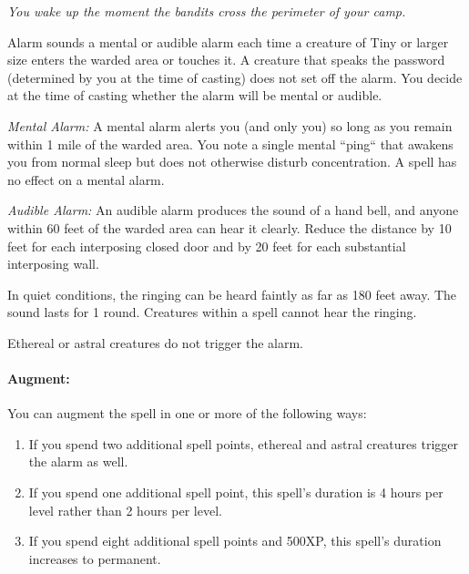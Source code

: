 \emph{You wake up the moment the bandits cross the perimeter of your camp.}

Alarm sounds a mental or audible alarm each time a creature of Tiny or larger size enters the warded area or touches it. 
A creature that speaks the password (determined by you at the time of casting) does not set off the alarm. 
You decide at the time of casting whether the alarm will be mental or audible.

\begin{list}{}{\leftmargin=1em}
 \item \emph{Mental Alarm:} A mental alarm alerts you (and only you) so long as you remain within 1 mile of the warded area. 
You note a single mental ``ping`` that awakens you from normal sleep but does not otherwise disturb concentration. 
A  spell has no effect on a mental alarm.
 \item \emph{Audible Alarm:} An audible alarm produces the sound of a hand bell, and anyone within 60 feet of the warded area can hear it clearly. 
Reduce the distance by 10 feet for each interposing closed door and by 20 feet for each substantial interposing wall.

In quiet conditions, the ringing can be heard faintly as far as 180 feet away. 
The sound lasts for 1 round. Creatures within a  spell cannot hear the ringing.
\end{list}

Ethereal or astral creatures do not trigger the alarm.

\paragraph{Augment:} You can augment the spell in one or more of the following ways:
\begin{enumerate}
\item If you spend two additional spell points, ethereal and astral creatures trigger the alarm as well.
\item If you spend one additional spell point, this spell's duration is 4 hours per level rather than 2 hours per level.
\item If you spend eight additional spell points and 500XP, this spell's duration increases to permanent.
\end{enumerate}
